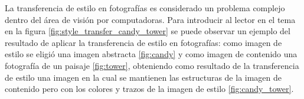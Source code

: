 \documentclass[a4paper,11pt,spanish]{book}
\begin{document}
    La transferencia de estilo en fotografías es considerado un problema complejo dentro del área de visión por computadoras.
    Para introducir al lector en el tema en la figura \ref{fig:style_transfer_candy_tower} se puede observar un ejemplo del resultado de aplicar la transferencia de estilo en 
    fotografías:
    como imagen de estilo se eligió una imagen abstracta \ref{fig:candy} y como imagen de contenido una fotografía de un paisaje \ref{fig:tower}, obteniendo como resultado de la
    transferencia de estilo una imagen en la cual se mantienen las estructuras de la imagen de contenido pero con los colores y trazos de la imagen de estilo \ref{fig:candy_tower}.
    \begin{figure}[h]
      \begin{center}
	\\
	\\ 

\end{center}
\end{figure}
\end{document}
